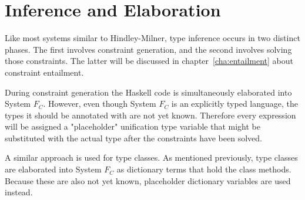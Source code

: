 \chapter{Inference and Elaboration}
\label{cha:inference}
Like most systems similar to Hindley-Milner, type inference occurs in two
distinct phases. The first involves constraint generation, and the second
involves solving those constraints. The latter will be discussed in
chapter~\ref{cha:entailment} about constraint entailment.

During constraint generation the Haskell code is simultaneously elaborated into
System $F_C$. However, even though System $F_C$ is an explicitly typed language,
the types it should be annotated with are not yet known. Therefore every
expression will be assigned a "placeholder" unification type variable that might
be substituted with the actual type after the constraints have been solved.

A similar approach is used for type classes. As mentioned previously, type
classes are elaborated into System $F_C$ as dictionary terms that hold the class
methods. Because these are also not yet known, placeholder dictionary variables
are used instead.


